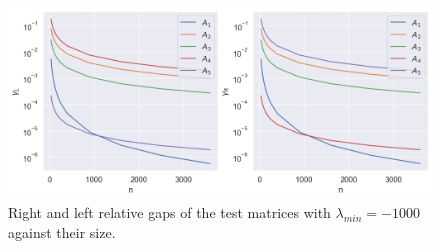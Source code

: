 \begin{figure}[h]
    \centering
    \includegraphics[width=.9\textwidth]{img/relgaps.png}
    \caption{Right and left relative gaps of the test matrices with $\lambda_{min} = -1000$ against their size.}
    \label{fig:relgaps}
\end{figure}

